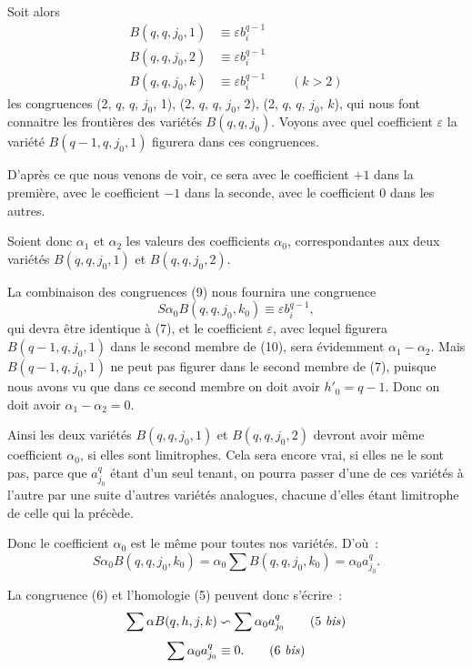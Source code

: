 \documentclass{article}
\begin{document}
Soit alors
\[ \begin{aligned} B(q, q, j_{0}, 1) &\equiv \varepsilon b^{q-1}_{i} \\ B(q, q, j_{0}, 2) &\equiv \varepsilon b^{q-1}_{i} \\ B(q, q, j_{0}, k) &\equiv \varepsilon b^{q-1}_{i} \qquad (k > 2) \end{aligned} \tag{9} \]
les congruences (2, $q$, $q$, $j_{0}$, 1), (2, $q$, $q$, $j_{0}$, 2), (2, $q$, $q$, $j_{0}$, $k$), qui nous font connaitre les frontières des variétés $B(q, q, j_{0})$. Voyons avec quel coefficient $\varepsilon$ la variété $B(q - 1, q, j_{0}, 1)$ figurera dans ces congruences.

D'après ce que nous venons de voir, ce sera avec le coefficient $+1$ dans la première, avec le coefficient $-1$ dans la seconde, avec le coefficient 0 dans les autres.

Soient donc $\alpha_{1}$ et $\alpha_{2}$ les valeurs des coefficients $\alpha_{0}$, correspondantes aux deux variétés $B(q, q, j_{0}, 1)$ et $B(q, q, j_{0}, 2)$.

La combinaison des congruences (9) nous fournira une congruence
\[ S \alpha_{0} B(q, q, j_{0}, k_{0}) \equiv \varepsilon b^{q-1}_{i}, \tag{10} \]
qui devra être identique à (7), et le coefficient $\varepsilon$, avec lequel figurera $B(q - 1, q, j_{0}, 1)$ dans le second membre de (10), sera évidemment $\alpha_{1} - \alpha_{2}$. Mais $B(q - 1, q, j_{0}, 1)$ ne peut pas figurer dans le second membre de (7), puisque nous avons vu que dans ce second membre on doit avoir $h'_{0} = q - 1$. Donc on doit avoir $\alpha_{1} - \alpha_{2} = 0$.

Ainsi les deux variétés $B(q, q, j_{0}, 1)$ et $B(q, q, j_{0}, 2)$ devront avoir même coefficient $\alpha_{0}$, si elles sont limitrophes. Cela sera encore vrai, si elles ne le sont pas, parce que $a^{q}_{j_{0}}$ étant d'un seul tenant, on pourra passer d'une de ces variétés à l'autre par une suite d'autres variétés analogues, chacune d'elles étant limitrophe de celle qui la précède.

Donc le coefficient $\alpha_{0}$ est le même pour toutes nos variétés. D'où~:
\[ S \alpha_{0} B(q, q, j_{0}, k_{0}) = \alpha_{0} \sum B(q, q, j_{0}, k_{0}) = \alpha_{0} a^{q}_{j_{0}}. \]

La congruence (6) et l'homologie (5) peuvent donc s'écrire~:
\[ \sum \alpha B(q, h, j, k) \backsim \sum \alpha_{0} a^{q}_{j_{0}} \tag{5 \textit{bis}} \]
\[ \sum \alpha_{0} a^{q}_{j_{0}} \equiv 0. \tag{6 \textit{bis}} \]
\end{document}
